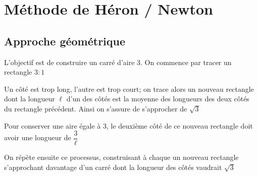 \documentclass[oneside,12pt]{article}          %
\begin{document}
\section{Méthode de Héron / Newton}

\subsection{Approche géométrique}

\begin{minipage}{0.55\linewidth} \restoreskip
	L'objectif est de construire un carré d'aire $3$. On commence par tracer un rectangle $3:1$
	
	Un côté est trop long, l'autre est trop court; on trace alors un nouveau rectangle dont la longueur $\ell$ d'un des côtés est la moyenne des longueurs des deux côtés du rectangle précédent. Ainsi on s'assure de s'approcher de $\sqrt{3}$
	
	Pour conserver une aire égale à $3$, le deuxième côté de ce nouveau rectangle doit avoir une longueur de $\dfrac{3}{\ell}$
	
	On répète ensuite ce processus, construisant à chaque un nouveau rectangle s'approchant davantage d'un carré dont la longueur des côtés vaudrait $\sqrt{3}$
	
\end{minipage} \hspace{10mm}
\begin{minipage}{0.4\linewidth}
\end{minipage}
\end{document}
